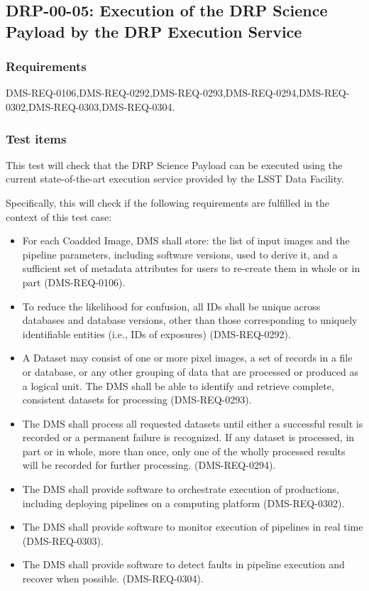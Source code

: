 \subsection{DRP-00-05: Execution of the DRP Science Payload by the DRP Execution Service}
\label{drp-00-05}

\subsubsection{Requirements}

DMS-REQ-0106,DMS-REQ-0292,DMS-REQ-0293,DMS-REQ-0294,DMS-REQ-0302,DMS-REQ-0303,DMS-REQ-0304.

\subsubsection{Test items}

This test will check that the DRP Science Payload can be executed using the current state-of-the-art execution service provided by the LSST Data Facility.

Specifically, this will check if the following requirements are fulfilled in the context of this test case:

\begin{itemize}
  \item{For each Coadded Image, DMS shall store: the list of input images and the pipeline parameters, including software versions, used to derive it, and a sufficient set of metadata attributes for users to re-create them in whole or in part (DMS-REQ-0106).}
  \item{To reduce the likelihood for confusion, all IDs shall be unique across databases and database versions, other than those corresponding to uniquely identifiable entities (i.e., IDs of exposures) (DMS-REQ-0292).}
  \item{A Dataset may consist of one or more pixel images, a set of records in a file or database, or any other grouping of data that are processed or produced as a logical unit. The DMS shall be able to identify and retrieve complete, consistent datasets for processing (DMS-REQ-0293).}
  \item{The DMS shall process all requested datasets until either a successful result is recorded or a permanent failure is recognized. If any dataset is processed, in part or in whole, more than once, only one of the wholly processed results will be recorded for further processing.
(DMS-REQ-0294).}
  \item{The DMS shall provide software to orchestrate execution of productions, including deploying pipelines on a computing platform (DMS-REQ-0302).}
  \item{The DMS shall provide software to monitor execution of pipelines in real time (DMS-REQ-0303).}
  \item{The DMS shall provide software to detect faults in pipeline execution and recover when possible.
(DMS-REQ-0304).}

\end{itemize}

